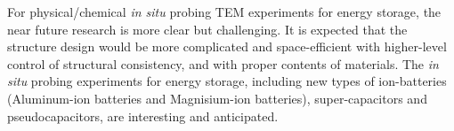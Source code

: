 For physical/chemical \textit{in situ} probing TEM experiments for energy storage, the near future research is more clear but challenging. It is expected that the structure design would be more complicated and space-efficient with higher-level control of structural consistency, and with proper contents of materials. The \textit{in situ} probing experiments for energy storage, including new types of ion-batteries (Aluminum-ion batteries and Magnisium-ion batteries), super-capacitors and pseudocapacitors, are interesting and anticipated. 
\color{black}

